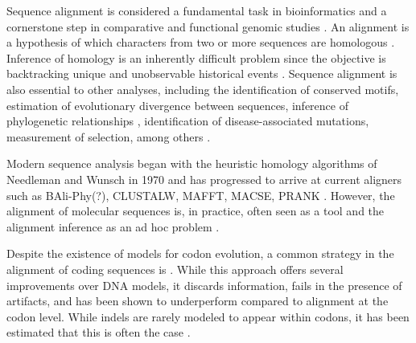 %


Sequence alignment is considered a fundamental task in bioinformatics and a
cornerstone step in comparative and functional genomic studies
\parencite{sequence_alignment_rosenberg_2009}.
An alignment is a hypothesis of which characters from two or more sequences are
homologous \parencite{problems_cartwright_2009}.
Inference of homology is an inherently difficult problem since the objective is
backtracking unique and unobservable historical events
\parencite{sequence_aln_morrison_2010}.
Sequence alignment is also essential to other analyses, including the
identification of conserved motifs, estimation of evolutionary divergence
between sequences, inference of phylogenetic relationships
\parencite{MSA_kumar_2007}, identification of disease-associated mutations,
measurement of selection, among others
\parencite{sequence_alignment_rosenberg_2009}.

Modern sequence analysis began with the heuristic homology algorithms of
Needleman and Wunsch in 1970 \parencite{identification_smith_1981} and has
progressed to arrive at current aligners such as BAli-Phy(?), CLUSTALW, MAFFT,
MACSE, PRANK .
However, the alignment of molecular sequences is, in practice, often seen as a
tool and the alignment inference as an ad hoc problem
\parencite{morrison_MSA_2018}.

Despite the existence of models for codon evolution, a common strategy in the
alignment of coding sequences is .
While this approach offers several improvements over DNA models, it discards
information, fails in the presence of artifacts, and has been shown to
underperform compared to alignment at the codon level.
While indels are rarely modeled to appear within codons, it has been estimated
that this is often the case \parencite{indel_phases_zhu_2019}.

